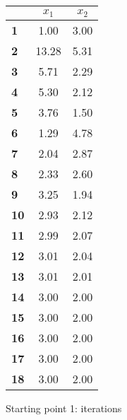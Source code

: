 \begin{small}\begin{tabular}{|l|c|c|}
\hline
&\textbf{$x_1$}&\textbf{$x_2$}\\\hline
\textbf{1}&1.00&3.00\\\hline
\textbf{2}&13.28&5.31\\\hline
\textbf{3}&5.71&2.29\\\hline
\textbf{4}&5.30&2.12\\\hline
\textbf{5}&3.76&1.50\\\hline
\textbf{6}&1.29&4.78\\\hline
\textbf{7}&2.04&2.87\\\hline
\textbf{8}&2.33&2.60\\\hline
\textbf{9}&3.25&1.94\\\hline
\textbf{10}&2.93&2.12\\\hline
\textbf{11}&2.99&2.07\\\hline
\textbf{12}&3.01&2.04\\\hline
\textbf{13}&3.01&2.01\\\hline
\textbf{14}&3.00&2.00\\\hline
\textbf{15}&3.00&2.00\\\hline
\textbf{16}&3.00&2.00\\\hline
\textbf{17}&3.00&2.00\\\hline
\textbf{18}&3.00&2.00\\\hline
\end{tabular}
\caption{Starting point 1: iterations}
    \label{tbl:local1}
\end{small}